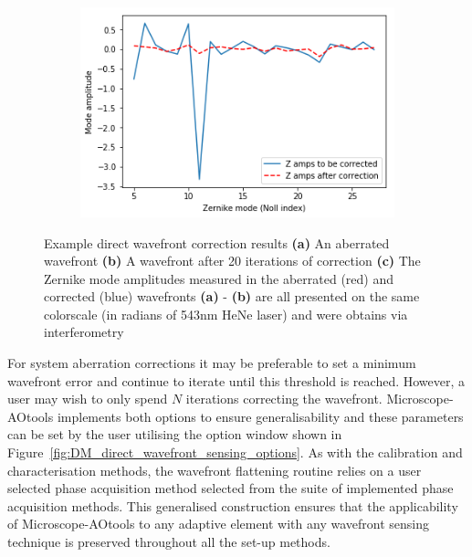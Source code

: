 \begin{figure}[h]
	\begin{subfigure}{0.55\textwidth}
		\centering
		\includegraphics[width=1\linewidth, scale=1]{./images/Zernike_modes_before_after_correction_only_corrected.png}
		\caption{}
		\label{fig:zernike_modes_to_show_flattening}
	\end{subfigure}
	\caption[Example direct wavefront correction results]{Example direct wavefront correction results \textbf{(a)} An aberrated wavefront \textbf{(b)} A wavefront after 20 iterations of correction \textbf{(c)} The Zernike mode amplitudes measured in the aberrated (red) and corrected (blue) wavefronts \textbf{(a)} - \textbf{(b)} are all presented on the same colorscale (in radians of 543nm HeNe laser) and were obtains via interferometry}
	\label{fig:direct_wavefront_correction}
\end{figure}

For system aberration corrections it may be preferable to set a minimum wavefront error and continue to iterate until this threshold is reached. However, a user may wish to only spend $N$ iterations correcting the wavefront. Microscope-AOtools implements both options to ensure generalisability and these parameters can be set by the user utilising the option window shown in Figure~\ref{fig:DM_direct_wavefront_sensing_options}. As with the calibration and characterisation methods, the wavefront flattening routine relies on a user selected phase acquisition method selected from the suite of implemented phase acquisition methods. This generalised construction ensures that the applicability of Microscope-AOtools to any adaptive element with any wavefront sensing technique is preserved throughout all the set-up methods.

